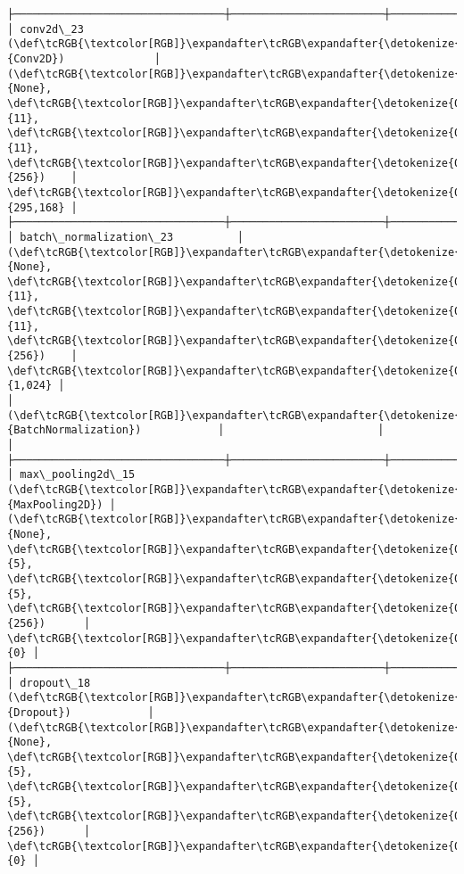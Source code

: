 \documentclass[11pt]{article}
\begin{document}
\begin{Verbatim}[commandchars=\\\{\}]
├─────────────────────────────────┼────────────────────────┼───────────────┤
│ conv2d\_23 (\def\tcRGB{\textcolor[RGB]}\expandafter\tcRGB\expandafter{\detokenize{0,135,255}}{Conv2D})              │ (\def\tcRGB{\textcolor[RGB]}\expandafter\tcRGB\expandafter{\detokenize{0,215,255}}{None}, \def\tcRGB{\textcolor[RGB]}\expandafter\tcRGB\expandafter{\detokenize{0,175,0}}{11}, \def\tcRGB{\textcolor[RGB]}\expandafter\tcRGB\expandafter{\detokenize{0,175,0}}{11}, \def\tcRGB{\textcolor[RGB]}\expandafter\tcRGB\expandafter{\detokenize{0,175,0}}{256})    │       \def\tcRGB{\textcolor[RGB]}\expandafter\tcRGB\expandafter{\detokenize{0,175,0}}{295,168} │
├─────────────────────────────────┼────────────────────────┼───────────────┤
│ batch\_normalization\_23          │ (\def\tcRGB{\textcolor[RGB]}\expandafter\tcRGB\expandafter{\detokenize{0,215,255}}{None}, \def\tcRGB{\textcolor[RGB]}\expandafter\tcRGB\expandafter{\detokenize{0,175,0}}{11}, \def\tcRGB{\textcolor[RGB]}\expandafter\tcRGB\expandafter{\detokenize{0,175,0}}{11}, \def\tcRGB{\textcolor[RGB]}\expandafter\tcRGB\expandafter{\detokenize{0,175,0}}{256})    │         \def\tcRGB{\textcolor[RGB]}\expandafter\tcRGB\expandafter{\detokenize{0,175,0}}{1,024} │
│ (\def\tcRGB{\textcolor[RGB]}\expandafter\tcRGB\expandafter{\detokenize{0,135,255}}{BatchNormalization})            │                        │               │
├─────────────────────────────────┼────────────────────────┼───────────────┤
│ max\_pooling2d\_15 (\def\tcRGB{\textcolor[RGB]}\expandafter\tcRGB\expandafter{\detokenize{0,135,255}}{MaxPooling2D}) │ (\def\tcRGB{\textcolor[RGB]}\expandafter\tcRGB\expandafter{\detokenize{0,215,255}}{None}, \def\tcRGB{\textcolor[RGB]}\expandafter\tcRGB\expandafter{\detokenize{0,175,0}}{5}, \def\tcRGB{\textcolor[RGB]}\expandafter\tcRGB\expandafter{\detokenize{0,175,0}}{5}, \def\tcRGB{\textcolor[RGB]}\expandafter\tcRGB\expandafter{\detokenize{0,175,0}}{256})      │             \def\tcRGB{\textcolor[RGB]}\expandafter\tcRGB\expandafter{\detokenize{0,175,0}}{0} │
├─────────────────────────────────┼────────────────────────┼───────────────┤
│ dropout\_18 (\def\tcRGB{\textcolor[RGB]}\expandafter\tcRGB\expandafter{\detokenize{0,135,255}}{Dropout})            │ (\def\tcRGB{\textcolor[RGB]}\expandafter\tcRGB\expandafter{\detokenize{0,215,255}}{None}, \def\tcRGB{\textcolor[RGB]}\expandafter\tcRGB\expandafter{\detokenize{0,175,0}}{5}, \def\tcRGB{\textcolor[RGB]}\expandafter\tcRGB\expandafter{\detokenize{0,175,0}}{5}, \def\tcRGB{\textcolor[RGB]}\expandafter\tcRGB\expandafter{\detokenize{0,175,0}}{256})      │             \def\tcRGB{\textcolor[RGB]}\expandafter\tcRGB\expandafter{\detokenize{0,175,0}}{0} │

\end{Verbatim}
\end{document}
